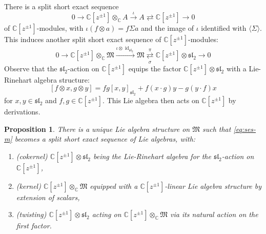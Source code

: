 \documentclass{article}
\def\fsl{\mathfrak{sl}}
\def\fM{\mathfrak{M}}
\def\CC{\mathbb{C}}
\DeclareMathOperator{\id}{\mathrm{id}}
\newtheorem{prop}{Proposition}
\theoremstyle{definition}
\begin{document}
There is a split short exact sequence
$$ 0 \to \CC[z^{\pm1}]\otimes_\CC A \xrightarrow{\iota} A \rightleftarrows \CC[z^{\pm1}] \to 0 $$
of $\CC[z^{\pm1}]$-modules, with $\iota(f\otimes a) = f\Sigma a$
and the image of $\iota$ identified with $\langle\Sigma\rangle$. This induces
another 
split short exact sequence of $\CC[z^{\pm1}]$-modules:
\begin{equation} 0 \to \CC[z^{\pm1}]\otimes_\CC \fM \xrightarrow{\iota\otimes\id_{\fsl_2}} \fM \overset{\pi}{\underset{\sigma}{\rightleftarrows}} \CC[z^{\pm1}]\otimes\fsl_2 \to 0 
\label{eq:ses-m}
\end{equation}
Observe that the $\fsl_2$-action on $\CC[z^{\pm1}]$ equips
the factor $\CC[z^{\pm1}]\otimes\fsl_2$ with a Lie-Rinehart algebra structure:
$$ [f\otimes x, g\otimes y] = fg[x,y]_{\fsl_2} + f(x\cdot g)y-g(y\cdot f)x $$
for $x,y\in\fsl_2$ and $f,g\in\CC[z^{\pm1}]$.
This Lie algebra then acts on $\CC[z^{\pm1}]$ by derivations.

\begin{prop}\label{pro:m}
        There is a unique Lie algebra structure on $\fM$ such that
        \eqref{eq:ses-m} becomes a split short exact sequence of Lie algebras, with:
        \begin{enumerate}
                \item (cokernel) $\CC[z^{\pm1}]\otimes\fsl_2$ being the Lie-Rinehart algebra for the $\fsl_2$-action on 
                        $\CC[z^{\pm1}]$,
                \item (kernel) $\CC[z^{\pm1}]\otimes_\CC\fM$ equipped with a $\CC[z^{\pm1}]$-linear
                       Lie algebra structure by extension of scalars,
                \item  (twisting) $\CC[z^{\pm1}]\otimes\fsl_2$ acting on $\CC[z^{\pm1}]\otimes_\CC\fM$
                       via its natural action on the first factor.
        \end{enumerate}
\end{prop}
\end{document}
